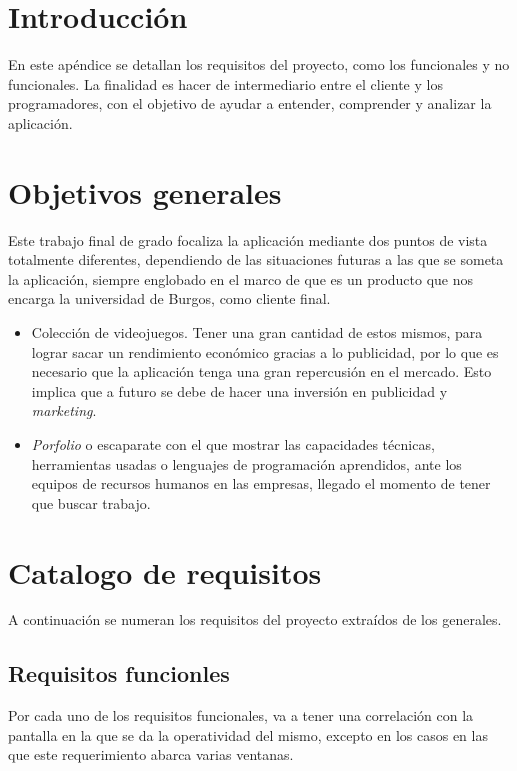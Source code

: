 
\section{Introducción}
En este apéndice se detallan los requisitos del proyecto, como los funcionales y no funcionales. La finalidad es hacer de intermediario entre el cliente y los programadores, con el objetivo de ayudar a entender, comprender y analizar la aplicación. 

\section{Objetivos generales}
Este trabajo final de grado focaliza la aplicación mediante dos puntos de vista totalmente diferentes, dependiendo de las situaciones futuras a las que se someta la aplicación, siempre englobado en el marco de que es un producto que nos encarga la universidad de Burgos, como cliente final.

\begin{itemize}
	\item Colección de videojuegos. Tener una gran cantidad de estos mismos, para lograr sacar un rendimiento económico gracias a lo publicidad, por lo que es necesario que la aplicación tenga una gran repercusión en el mercado. Esto implica que a futuro se debe de hacer una inversión en publicidad y \emph{marketing}.
	\item \emph{Porfolio} \cite{wiki:portafolio} o escaparate con el que mostrar las capacidades técnicas, herramientas usadas o lenguajes de programación aprendidos, ante los equipos de recursos humanos en las empresas, llegado el momento de tener que buscar trabajo. 
\end{itemize}

\section{Catalogo de requisitos}
A continuación se numeran los requisitos del proyecto extraídos de los generales.

\subsection{Requisitos funcionles}
Por cada uno de los requisitos funcionales, va a tener una correlación con la pantalla en la que se da la operatividad del mismo, excepto en los casos en las que este requerimiento abarca varias ventanas.

